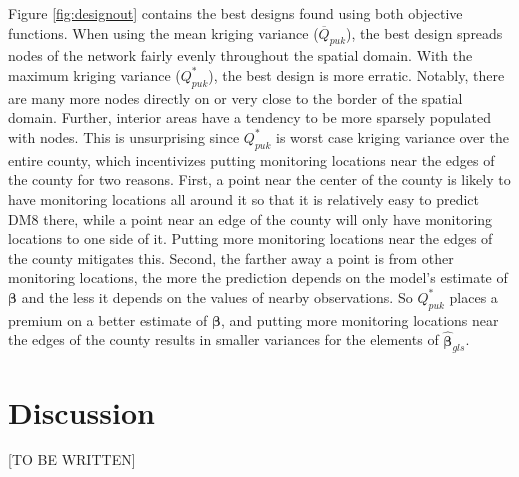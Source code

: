 \documentclass[cmbright]{staauth}
\begin{document}
Figure \ref{fig:designout} contains the best designs found using both objective functions. When using the mean kriging variance ($\overline{Q}_{puk}$), the best design spreads nodes of the network fairly evenly throughout the spatial domain. With the maximum kriging variance ($Q^*_{puk}$), the best design is more erratic. Notably, there are many more nodes directly on or very close to the border of the spatial domain. Further, interior areas have a tendency to be more sparsely populated with nodes. This is unsurprising since $Q^*_{puk}$ is worst case kriging variance over the entire county, which incentivizes putting monitoring locations near the edges of the county for two reasons. First, a point near the center of the county is likely to have monitoring locations all around it so that it is relatively easy to predict DM8 there, while a point near an edge of the county will only have monitoring locations to one side of it. Putting more monitoring locations near the edges of the county mitigates this. Second, the farther away a point is from other monitoring locations, the more the prediction depends on the model's estimate of $\bm{\beta}$ and the less it depends on the values of nearby observations. So $Q^*_{puk}$ places a premium on a better estimate of $\bm{\beta}$, and putting more monitoring locations near the edges of the county results in smaller variances for the elements of $\widehat{\bm{\beta}}_{gls}$.

\section{Discussion}\label{sec:discuss}
[TO BE WRITTEN]



\end{document}
